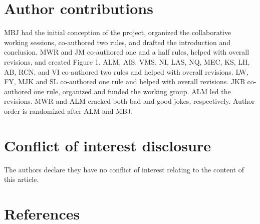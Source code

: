 \documentclass[
  12pt,
]{article}
\begin{document}
\hypertarget{author-contributions}{%
\section{Author contributions}\label{author-contributions}}

MBJ had the initial conception of the project, organized the
collaborative working sessions, co-authored two rules, and drafted the
introduction and conclusion. MWR and JM co-authored one and a half
rules, helped with overall revisions, and created Figure 1. ALM, AIS,
VMS, NI, LAS, NQ, MEC, KS, LH, AB, RCN, and VI co-authored two rules and
helped with overall revisions. LW, FY, MJK and SL co-authored one rule
and helped with overall revisions. JKB co-authored one rule, organized
and funded the working group. ALM led the revisions. MWR and ALM cracked
both bad and good jokes, respectively. Author order is randomized after
ALM and MBJ.

\hypertarget{conflict-of-interest-disclosure}{%
\section{Conflict of interest
disclosure}\label{conflict-of-interest-disclosure}}

The authors declare they have no conflict of interest relating to the
content of this article.

\hypertarget{references}{%
\section{References}\label{references}}
\end{document}
